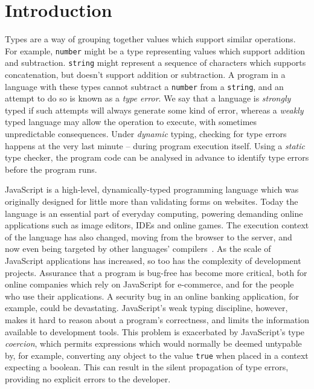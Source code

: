 \documentclass[12pt,a4paper,twoside,openright]{report}
\theoremstyle{definition}
\theoremstyle{dotless}
\newcommand*{\js}{\texttt}
\begin{document}
\chapter{Introduction}\label{introduction}

Types are a way of grouping together values which support similar operations.
For example, \texttt{number} might be a type representing values which support
addition and subtraction. \texttt{string} might represent a sequence of
characters which supports concatenation, but doesn't support addition or
subtraction. A program in a language with these types cannot subtract a
\texttt{number} from a \texttt{string}, and an attempt to do so is known as a
\textit{type error}. We say that a language is \textit{strongly} typed if such
attempts will always generate some kind of error, whereas a \textit{weakly}
typed language may allow the operation to execute, with sometimes
unpredictable consequences. Under \textit{dynamic} typing, checking for type
errors happens at the very last minute -- during program execution itself.
Using a \textit{static} type checker, the program code can be analysed in
advance to identify type errors before the program runs.

JavaScript is a high-level, dynamically-typed programming language which was
originally designed for little more than validating forms on websites. Today
the language is an essential part of everyday computing, powering demanding
online applications such as image editors, IDEs and online games. The
execution context of the language has also changed, moving from the browser to
the server, and now even being targeted by other languages'
compilers~\cite{asm}. As the scale of JavaScript applications has increased,
so too has the complexity of development projects. Assurance that a program is
bug-free has become more critical, both for online companies which rely on
JavaScript for e-commerce, and for the people who use their applications. A
security bug in an online banking application, for example, could be
devastating. JavaScript's weak typing discipline, however, makes it hard to
reason about a program's correctness, and limits the information available to
development tools. This problem is exacerbated by JavaScript's type
\textit{coercion}, which permits expressions which would normally be deemed
untypable by, for example, converting any object to the value \js{true} when
placed in a context expecting a boolean. This can result in the silent propagation
of type errors, providing no explicit errors to the developer.
\end{document}
